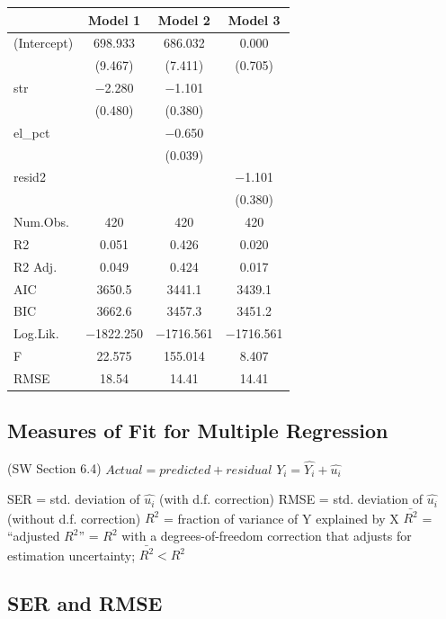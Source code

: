\documentclass[
  letterpaper,
  DIV=11,
  numbers=noendperiod]{scrartcl}
\begin{document}
\begin{table}
\centering
\begin{tabular}[t]{lccc}
\toprule
  & Model 1 & Model 2 & Model 3\\
\midrule
(Intercept) & \num{698.933} & \num{686.032} & \num{0.000}\\
 & (\num{9.467}) & (\num{7.411}) & (\num{0.705})\\
str & \num{-2.280} & \num{-1.101} & \\
 & (\num{0.480}) & (\num{0.380}) & \\
el\_pct &  & \num{-0.650} & \\
 &  & (\num{0.039}) & \\
resid2 &  &  & \num{-1.101}\\
 &  &  & (\num{0.380})\\
\midrule
Num.Obs. & \num{420} & \num{420} & \num{420}\\
R2 & \num{0.051} & \num{0.426} & \num{0.020}\\
R2 Adj. & \num{0.049} & \num{0.424} & \num{0.017}\\
AIC & \num{3650.5} & \num{3441.1} & \num{3439.1}\\
BIC & \num{3662.6} & \num{3457.3} & \num{3451.2}\\
Log.Lik. & \num{-1822.250} & \num{-1716.561} & \num{-1716.561}\\
F & \num{22.575} & \num{155.014} & \num{8.407}\\
RMSE & \num{18.54} & \num{14.41} & \num{14.41}\\
\bottomrule
\end{tabular}
\end{table}

\hypertarget{measures-of-fit-for-multiple-regression}{%
\subsection{Measures of Fit for Multiple
Regression}\label{measures-of-fit-for-multiple-regression}}

(SW Section 6.4) \(Actual = predicted + residual\)
\(Y_i = \hat{Y_i} + \hat{u_i}\)

SER = std. deviation of \(\hat{u_i}\) (with d.f. correction) RMSE = std.
deviation of \(\hat{u_i}\) (without d.f. correction) \(R^2\) = fraction
of variance of Y explained by X \(\bar{R^2}\) = ``adjusted \(R^2\)'' =
\(R^2\) with a degrees-of-freedom correction that adjusts for estimation
uncertainty; \(\bar{R^2} <R^2\)

\hypertarget{ser-and-rmse}{%
\subsection{SER and RMSE}\label{ser-and-rmse}}
\end{document}
